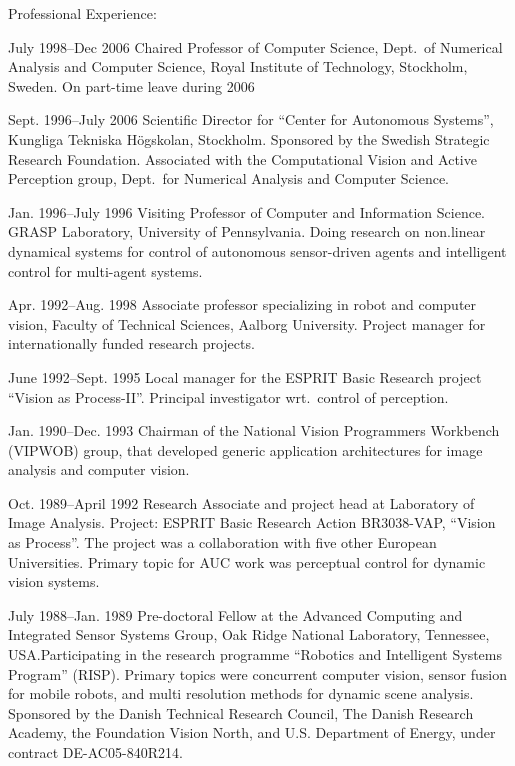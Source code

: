 \documentclass{article}
\begin{document}
\begin{cv}
\begin{cvlist}{Professional Experience:}
		\item[July 1998--Dec 2006] Chaired Professor of Computer Science,
		Dept.\ of Numerical Analysis and Computer Science, Royal Institute
		of Technology, Stockholm, Sweden. On part-time leave during 2006

		\item[Sept. 1996--July 2006] Scientific Director for ``Center for
		Autonomous Systems'', Kungliga Tek\-ni\-ska H\"og\-skolan,
		Stock\-holm.  Sponsored by the Swedish Strategic Research
		Foundation. Associated with the Computational Vision and Active
		Perception group, Dept.~for Numerical Analysis and Computer
		Science.

		\item[Jan. 1996--July 1996] Visiting Professor of Computer and
		Information Science.  GRASP Laboratory, University of Pennsylvania.
		Doing research on non.linear dynamical systems for control of
		autonomous sensor-driven agents and intelligent control for
		multi-agent systems.

		\item[Apr. 1992--Aug. 1998] Associate professor specializing in robot
		and computer vision, Faculty of Technical Sciences, Aalborg
		University.  Project manager for internationally funded research
		projects.

		\item[June 1992--Sept. 1995] Local manager for the ESPRIT Basic
		Research project ``Vision as Process-II''.  Principal investigator
		wrt.\ control of perception.

		\item[Jan. 1990--Dec. 1993] Chairman of the National Vision Programmers
		Workbench (VIPWOB) group, that developed generic application architectures for
		image analysis and computer vision.

		\item[Oct. 1989--April 1992] Research Associate and project head at Laboratory
		of Image Analysis. Project: ESPRIT Basic Research Action BR3038-VAP, ``Vision
		as Process''. The project was a collaboration with five other European
		Universities. Primary topic for AUC work was perceptual control for dynamic
		vision systems.

		\item[July 1988--Jan. 1989] Pre-doctoral Fellow at the Advanced Computing and
		Integrated Sensor Systems Group, Oak Ridge National Laboratory, Tennessee,
		USA.\@ Participating in the research programme ``Robotics and Intelligent
		Systems Program'' (RISP). Primary topics were concurrent computer vision,
		sensor fusion for mobile robots, and multi resolution methods for dynamic
		scene analysis. Sponsored by the Danish Technical Research Council, The Danish
		Research Academy, the Foundation Vision North, and U.S. Department of Energy,
		under contract DE-AC05-840R214.\@


\end{cvlist}
\end{cv}
\end{document}
